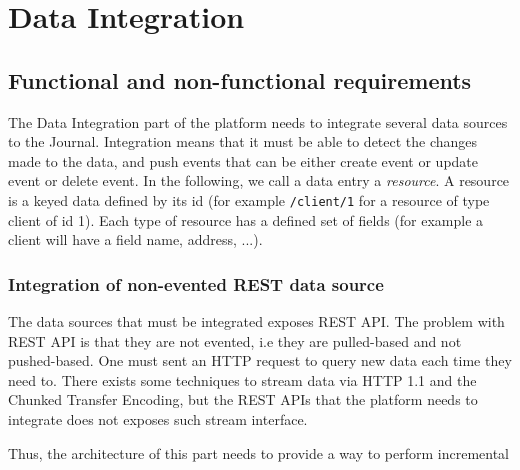 \chapter{Data Integration}

\section{Functional and non-functional requirements}

The Data Integration part of the platform needs to integrate several data sources to the Journal. Integration means that it must be able 
to detect the changes made to the data, and push events that can be either create event or update event or delete event.
In the following, we call a data entry a \textit{resource}. A resource is a keyed data defined by its id (for example \verb|/client/1| for a
resource of type client of id 1). Each type of resource has a defined set of fields (for example a client
will have a field name, address, ...).

\subsection{Integration of non-evented REST data source}
The data sources that must be integrated exposes REST API. The problem with REST API is that they are not evented, i.e
they are pulled-based and not pushed-based. One must sent an HTTP request to query new data each time they need to.
There exists some techniques to stream data via HTTP 1.1 and the Chunked Transfer Encoding, but the REST APIs that the platform
needs to integrate does not exposes such stream interface. 

Thus, the architecture of this part needs to provide a way to perform incremental 




